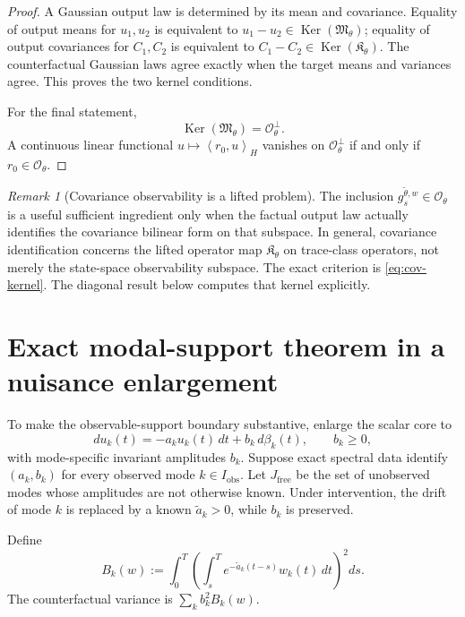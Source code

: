 \documentclass[11pt]{article}
\theoremstyle{remark}
\newtheorem{remark}[assumption]{Remark}
\newcommand{\Ker}{\operatorname{Ker}}
\newcommand{\ip}[2]{\left\langle #1,#2\right\rangle_H}
\newcommand{\obs}{\mathrm{obs}}
\newcommand{\1}{\mathbf 1}
\begin{document}
\begin{proof}
A Gaussian output law is determined by its mean and covariance.  Equality of output means for $u_1,u_2$ is equivalent to
$u_1-u_2\in\Ker(\mathfrak M_\theta)$; equality of output covariances for $C_1,C_2$ is equivalent to
$C_1-C_2\in\Ker(\mathfrak K_\theta)$.  The counterfactual Gaussian laws agree exactly when the target means and variances agree.  This proves the two kernel conditions.

For the final statement,
\[
 \Ker(\mathfrak M_\theta)
 =\mathcal O_\theta^\perp.
\]
A continuous linear functional $u\mapsto\ip{r_0}{u}$ vanishes on
$\mathcal O_\theta^\perp$ if and only if $r_0\in\mathcal O_\theta$.
\end{proof}

\begin{remark}[Covariance observability is a lifted problem]
The inclusion $g_s^{\widetilde\theta,w}\in\mathcal O_\theta$ is a useful sufficient ingredient only when the factual output law actually identifies the covariance bilinear form on that subspace.  In general, covariance identification concerns the lifted operator map $\mathfrak K_\theta$ on trace-class operators, not merely the state-space observability subspace.  The exact criterion is \eqref{eq:cov-kernel}.  The diagonal result below computes that kernel explicitly.
\end{remark}

\section{Exact modal-support theorem in a nuisance enlargement}\label{sec:modal-nuisance}

To make the observable-support boundary substantive, enlarge the scalar core to
\begin{equation}\label{eq:modal-nuisance}
 du_k(t)=-a_ku_k(t)\,dt+b_k\,d\beta_k(t),
 \qquad b_k\ge0,
\end{equation}
with mode-specific invariant amplitudes $b_k$.  Suppose exact spectral data identify $(a_k,b_k)$ for every observed mode $k\in I_{\obs}$.  Let $J_{\mathrm{free}}$ be the set of unobserved modes whose amplitudes are not otherwise known.  Under intervention, the drift of mode $k$ is replaced by a known $\widetilde a_k>0$, while $b_k$ is preserved.

Define
\begin{equation}\label{eq:Bk}
 B_k(w):=\int_0^T
 \left(\int_s^T e^{-\widetilde a_k(t-s)}w_k(t)\,dt\right)^2ds.
\end{equation}
The counterfactual variance is $\sum_kb_k^2B_k(w)$.
\end{document}
